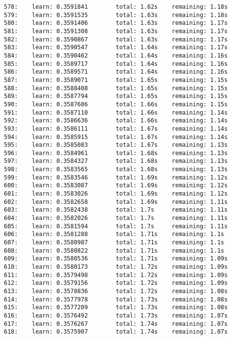 \documentclass[11pt]{article}
\begin{document}
\begin{Verbatim}[commandchars=\\\{\}]
578:    learn: 0.3591841        total: 1.62s    remaining: 1.18s
579:    learn: 0.3591535        total: 1.63s    remaining: 1.18s
580:    learn: 0.3591406        total: 1.63s    remaining: 1.17s
581:    learn: 0.3591308        total: 1.63s    remaining: 1.17s
582:    learn: 0.3590867        total: 1.63s    remaining: 1.17s
583:    learn: 0.3590547        total: 1.64s    remaining: 1.17s
584:    learn: 0.3590462        total: 1.64s    remaining: 1.16s
585:    learn: 0.3589717        total: 1.64s    remaining: 1.16s
586:    learn: 0.3589571        total: 1.64s    remaining: 1.16s
587:    learn: 0.3589071        total: 1.65s    remaining: 1.15s
588:    learn: 0.3588408        total: 1.65s    remaining: 1.15s
589:    learn: 0.3587794        total: 1.65s    remaining: 1.15s
590:    learn: 0.3587606        total: 1.66s    remaining: 1.15s
591:    learn: 0.3587110        total: 1.66s    remaining: 1.14s
592:    learn: 0.3586636        total: 1.66s    remaining: 1.14s
593:    learn: 0.3586111        total: 1.67s    remaining: 1.14s
594:    learn: 0.3585915        total: 1.67s    remaining: 1.14s
595:    learn: 0.3585083        total: 1.67s    remaining: 1.13s
596:    learn: 0.3584961        total: 1.68s    remaining: 1.13s
597:    learn: 0.3584327        total: 1.68s    remaining: 1.13s
598:    learn: 0.3583565        total: 1.68s    remaining: 1.13s
599:    learn: 0.3583546        total: 1.69s    remaining: 1.12s
600:    learn: 0.3583087        total: 1.69s    remaining: 1.12s
601:    learn: 0.3583026        total: 1.69s    remaining: 1.12s
602:    learn: 0.3582658        total: 1.69s    remaining: 1.11s
603:    learn: 0.3582438        total: 1.7s     remaining: 1.11s
604:    learn: 0.3582026        total: 1.7s     remaining: 1.11s
605:    learn: 0.3581594        total: 1.7s     remaining: 1.11s
606:    learn: 0.3581288        total: 1.71s    remaining: 1.1s
607:    learn: 0.3580987        total: 1.71s    remaining: 1.1s
608:    learn: 0.3580822        total: 1.71s    remaining: 1.1s
609:    learn: 0.3580536        total: 1.71s    remaining: 1.09s
610:    learn: 0.3580173        total: 1.72s    remaining: 1.09s
611:    learn: 0.3579498        total: 1.72s    remaining: 1.09s
612:    learn: 0.3579156        total: 1.72s    remaining: 1.09s
613:    learn: 0.3578836        total: 1.72s    remaining: 1.08s
614:    learn: 0.3577978        total: 1.73s    remaining: 1.08s
615:    learn: 0.3577209        total: 1.73s    remaining: 1.08s
616:    learn: 0.3576492        total: 1.73s    remaining: 1.07s
617:    learn: 0.3576267        total: 1.74s    remaining: 1.07s
618:    learn: 0.3575907        total: 1.74s    remaining: 1.07s

\end{Verbatim}
\end{document}
